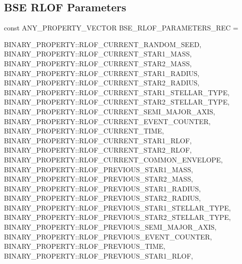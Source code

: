 \newpage
\subsection{BSE RLOF Parameters}\label{sec:BSERLOFParameters}

const ANY\_PROPERTY\_VECTOR BSE\_RLOF\_PARAMETERS\_REC = \lcb

\hfill
\begin{minipage}{\dimexpr\textwidth-2em}
    BINARY\_PROPERTY::RLOF\_CURRENT\_RANDOM\_SEED, \\
    BINARY\_PROPERTY::RLOF\_CURRENT\_STAR1\_MASS, \\
    BINARY\_PROPERTY::RLOF\_CURRENT\_STAR2\_MASS, \\
    BINARY\_PROPERTY::RLOF\_CURRENT\_STAR1\_RADIUS, \\
    BINARY\_PROPERTY::RLOF\_CURRENT\_STAR2\_RADIUS, \\
    BINARY\_PROPERTY::RLOF\_CURRENT\_STAR1\_STELLAR\_TYPE, \\
    BINARY\_PROPERTY::RLOF\_CURRENT\_STAR2\_STELLAR\_TYPE, \\
    BINARY\_PROPERTY::RLOF\_CURRENT\_SEMI\_MAJOR\_AXIS, \\
    BINARY\_PROPERTY::RLOF\_CURRENT\_EVENT\_COUNTER, \\
    BINARY\_PROPERTY::RLOF\_CURRENT\_TIME, \\
    BINARY\_PROPERTY::RLOF\_CURRENT\_STAR1\_RLOF, \\
    BINARY\_PROPERTY::RLOF\_CURRENT\_STAR2\_RLOF, \\
    BINARY\_PROPERTY::RLOF\_CURRENT\_COMMON\_ENVELOPE, \\
    BINARY\_PROPERTY::RLOF\_PREVIOUS\_STAR1\_MASS, \\
    BINARY\_PROPERTY::RLOF\_PREVIOUS\_STAR2\_MASS, \\
    BINARY\_PROPERTY::RLOF\_PREVIOUS\_STAR1\_RADIUS, \\
    BINARY\_PROPERTY::RLOF\_PREVIOUS\_STAR2\_RADIUS, \\
    BINARY\_PROPERTY::RLOF\_PREVIOUS\_STAR1\_STELLAR\_TYPE, \\
    BINARY\_PROPERTY::RLOF\_PREVIOUS\_STAR2\_STELLAR\_TYPE, \\
    BINARY\_PROPERTY::RLOF\_PREVIOUS\_SEMI\_MAJOR\_AXIS, \\
    BINARY\_PROPERTY::RLOF\_PREVIOUS\_EVENT\_COUNTER, \\
    BINARY\_PROPERTY::RLOF\_PREVIOUS\_TIME, \\
    BINARY\_PROPERTY::RLOF\_PREVIOUS\_STAR1\_RLOF, \\

\end{minipage}
